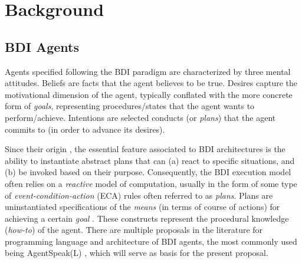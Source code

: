

\section{Background} 
\label{sec:2}
\subsection{BDI Agents}

Agents specified following the BDI paradigm are characterized by three mental attitudes. Beliefs are facts that the agent believes to be true. Desires capture the motivational dimension of the agent, typically conflated with the more concrete form of \textit{goals}, representing procedures/states that the agent wants to perform/achieve. Intentions are selected conducts (or \textit{plans}) that the agent commits to (in order to advance its desires). 

Since their origin \cite{Rao1995}, the essential feature associated to BDI architectures is the ability to instantiate abstract plans that can (a) react to specific situations, and (b) be invoked based on their purpose. Consequently, the BDI execution model often relies on a \textit{reactive} model of computation, usually in the form of some type of \textit{event-condition-action} (ECA) rules often referred to as \textit{plans}. Plans are uninstantiated specifications of the \textit{means} (in terms of course of actions) for achieving a certain \textit{goal} \cite{Rao1995}. These constructs represent the procedural knowledge (\textit{how-to}) of the agent. There are multiple proposals in the literature for programming language and architecture of BDI agents, the most commonly used being AgentSpeak(L) \cite{RaoAS1996}, which will serve as basis for the present proposal. %

